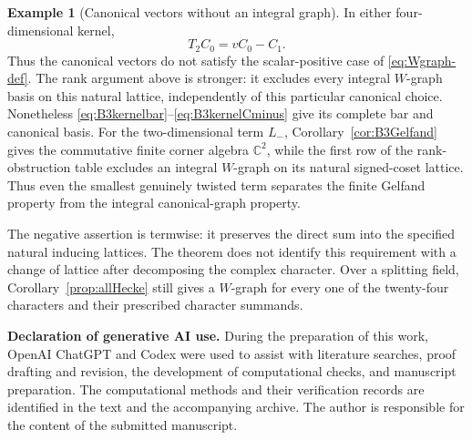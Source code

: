 \documentclass[11pt]{article}
\numberwithin{equation}{section}
\theoremstyle{definition}
\newtheorem{example}[theorem]{Example}
\newcommand{\C}{\mathbb C}
\begin{document}
\begin{example}[Canonical vectors without an integral graph]
In either four-dimensional kernel,
\[
 T_2C_0=vC_0-C_1.
\]
Thus the canonical vectors do not satisfy the scalar-positive case of
\eqref{eq:Wgraph-def}.
The rank argument above is stronger: it excludes every integral \(W\)-graph basis on this natural lattice, independently of this particular canonical choice.
Nonetheless \eqref{eq:B3kernelbar}--\eqref{eq:B3kernelCminus} give its complete bar and canonical basis.
For the two-dimensional term \(L_-\), Corollary~\ref{cor:B3Gelfand}
gives the commutative finite corner algebra \(\C^2\), while the first
row of the rank-obstruction table excludes an integral \(W\)-graph on
its natural signed-coset lattice.  Thus even the smallest genuinely
twisted term separates the finite Gelfand property from the integral
canonical-graph property.
\end{example}

The negative assertion is termwise: it preserves the direct sum into the specified natural inducing lattices.
The theorem does not identify this requirement with a change of lattice after decomposing the complex character.
Over a splitting field, Corollary~\ref{prop:allHecke} still gives a \(W\)-graph for every one of the twenty-four characters and their prescribed character summands.
\medskip


\noindent\textbf{Declaration of generative AI use.}
During the preparation of this work, OpenAI ChatGPT and Codex were used to assist with literature searches, proof drafting and revision, the development of computational checks, and manuscript preparation.
The computational methods and their verification records are identified in the text and the accompanying archive.
The author is responsible for the content of the submitted manuscript.
\end{document}
